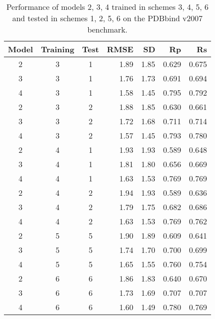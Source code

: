 \documentclass[twocolumn]{bmcart}
\begin{document}
\begin{backmatter}
\begin{table}[ht]
\caption{Performance of models 2, 3, 4 trained in schemes 3, 4, 5, 6 and tested in schemes 1, 2, 5, 6 on the PDBbind v2007 benchmark.}
\label{rescoring2:set-1-pdbbind-2007-trn-3456-tst-1256-raw}
\begin{tabular}{cccrrrr}
\hline
Model & Training & Test & RMSE & SD & Rp & Rs\\
\hline
2 & 3 & 1 & 1.89 & 1.85 & 0.629 & 0.675\\
3 & 3 & 1 & 1.76 & 1.73 & 0.691 & 0.694\\
4 & 3 & 1 & 1.58 & 1.45 & 0.795 & 0.792\\
\hline
2 & 3 & 2 & 1.88 & 1.85 & 0.630 & 0.661\\
3 & 3 & 2 & 1.72 & 1.68 & 0.711 & 0.714\\
4 & 3 & 2 & 1.57 & 1.45 & 0.793 & 0.780\\
\hline
2 & 4 & 1 & 1.93 & 1.93 & 0.589 & 0.648\\
3 & 4 & 1 & 1.81 & 1.80 & 0.656 & 0.669\\
4 & 4 & 1 & 1.63 & 1.53 & 0.769 & 0.769\\
\hline
2 & 4 & 2 & 1.94 & 1.93 & 0.589 & 0.636\\
3 & 4 & 2 & 1.79 & 1.75 & 0.682 & 0.686\\
4 & 4 & 2 & 1.63 & 1.53 & 0.769 & 0.762\\
\hline
2 & 5 & 5 & 1.90 & 1.89 & 0.609 & 0.641\\
3 & 5 & 5 & 1.74 & 1.70 & 0.700 & 0.699\\
4 & 5 & 5 & 1.65 & 1.55 & 0.760 & 0.754\\
\hline
2 & 6 & 6 & 1.86 & 1.83 & 0.640 & 0.670\\
3 & 6 & 6 & 1.73 & 1.69 & 0.707 & 0.707\\
4 & 6 & 6 & 1.60 & 1.49 & 0.780 & 0.769\\
\hline
\end{tabular}
\end{table}


\end{backmatter}
\end{document}
